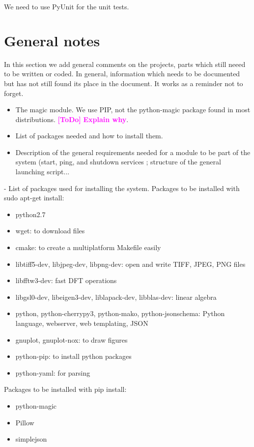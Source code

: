 \documentclass[a4paper,12pt]{article}
\newcommand{\ToDo}[1]{\textcolor{magenta}{\textbf{[ToDo]} \textbf{#1}}}
\begin{document}
We need to use PyUnit for the unit tests.

\section{General notes}
In this section we add general comments on the projects, parts which still neeed to be written or coded. In general, information which needs to be documented but has not still found its place in the document. It works as a reminder not to forget.

\begin{itemize}
  \item The magic module. We use PIP, not the python-magic package found in most distributions. \ToDo{Explain why}.
  \item List of packages needed and how to install them.
  \item Description of the general requirements needed for a module to be part of the system (start, ping, and shutdown services ; structure of the general launching script...
\end{itemize}

- List of packages used for installing the system. Packages to be installed with sudo apt-get install:

\begin{itemize}
\item python2.7
\item wget: to download files
\item cmake: to create a multiplatform Makefile easily
\item libtiff5-dev, libjpeg-dev, libpng-dev: open and write TIFF, JPEG, PNG files
\item libfftw3-dev: fast DFT operations
\item libgsl0-dev, libeigen3-dev, liblapack-dev, libblas-dev: linear algebra
\item python, python-cherrypy3, python-mako, python-jsonschema: Python language, webserver, web templating, JSON
\item gnuplot, gnuplot-nox: to draw figures
\item python-pip: to install python packages
\item python-yaml: for parsing
\end{itemize}
Packages to be installed with pip install:
\begin{itemize}
\item python-magic
\item Pillow
\item simplejson
\end{itemize}
\end{document}
